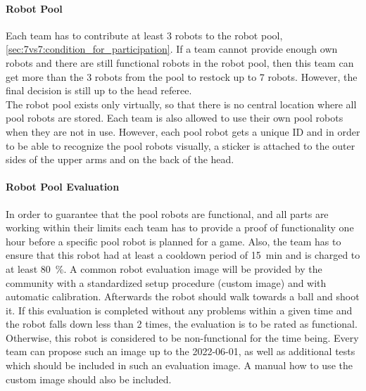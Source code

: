         \paragraph{Robot Pool}
            Each team has to contribute at least 3 robots to the robot pool, \cf \cref{sec:7vs7:condition_for_participation}. If a team cannot provide enough own robots and there are still functional robots in the robot pool, then this team can get more than the 3 robots from the pool to restock up to 7 robots. However, the final decision is still up to the head referee. \\
            The robot pool exists only virtually, so that there is no central location where all pool robots are stored. Each team is also allowed to use their own pool robots when they are not in use. However, each pool robot gets a unique ID and in order to be able to recognize the pool robots visually, a sticker is attached to the outer sides of the upper arms and on the back of the head.

        \paragraph{Robot Pool Evaluation}
            \label{sec:robot_pool_evaluation}
            In order to guarantee that the pool robots are functional, and all parts are working within their limits each team has to provide a proof of functionality one hour before a specific pool robot is planned for a game. Also, the team has to ensure that this robot had at least a cooldown period of \qty{15}{\minute} and is charged to at least \qty{80}{\percent}.
            A common robot evaluation image will be provided by the community with a standardized setup procedure (custom image) and with automatic calibration. Afterwards the robot should walk towards a ball and shoot it. If this evaluation is completed without any problems within a given time  and the robot falls down less than 2 times, the evaluation is to be rated as functional. Otherwise, this robot is considered to be non-functional for the time being. Every team can propose such an image up to the 2022-06-01, as well as additional tests which should be included in such an evaluation image. A manual how to use the custom image should also be included.

